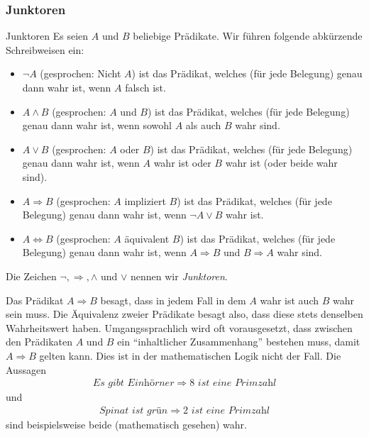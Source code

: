 \subsubsection{Junktoren}

\begin{concept}{Junktoren}
    Es seien $A$ und $B$ beliebige Prädikate. Wir führen folgende abkürzende Schreibweisen ein:
    \begin{itemize}
        \item $\neg A$ (gesprochen: Nicht $A$) ist das Prädikat, welches (für jede Belegung) genau dann wahr ist, wenn $A$ falsch ist.
        \item $A\wedge B$ (gesprochen: $A$ und $B$)  ist das Prädikat, welches (für jede Belegung) genau dann wahr ist, wenn sowohl $A$ als auch $B$ wahr sind.
        \item $A\vee B$ (gesprochen: $A$ oder $B$)  ist das Prädikat, welches (für jede Belegung) genau dann wahr ist, wenn $A$ wahr ist oder $B$ wahr ist (oder beide wahr sind).
        \item $A\Rightarrow B$ (gesprochen: $A$ impliziert $B$) ist das Prädikat, welches (für jede Belegung) genau dann wahr ist, wenn $\neg A\vee B$ wahr ist.
        \item $A\Leftrightarrow B$ (gesprochen: $A$ äquivalent $B$)  ist das Prädikat, welches (für jede Belegung) genau dann wahr ist, wenn $A\Rightarrow B$ und $B\Rightarrow A$ wahr sind.
    \end{itemize}
    Die Zeichen $\neg,\Rightarrow,\wedge$ und $\vee$ nennen wir \textit{Junktoren}.
\end{concept}

\begin{remark}
    Das Prädikat $A\Rightarrow B$ besagt, dass in jedem Fall in dem $A$ wahr ist auch $B$ wahr sein muss.
    Die Äquivalenz zweier Prädikate besagt also, dass diese stets denselben Wahrheitswert haben. Umgangssprachlich wird oft vorausgesetzt, dass zwischen den Prädikaten $A$ und $B$ ein ``inhaltlicher Zusammenhang'' bestehen muss, damit $A\Rightarrow B$ gelten kann. Dies ist in der mathematischen Logik nicht der Fall. Die Aussagen
    \begin{align*}
        \textit{Es gibt Einhörner}\Rightarrow 8\textit{ ist eine Primzahl}
    \end{align*}
    und
    \begin{align*}
        \textit{Spinat ist grün}\Rightarrow 2\textit{ ist eine Primzahl}
    \end{align*}
    sind beispielsweise beide (mathematisch gesehen) wahr.
\end{remark}

